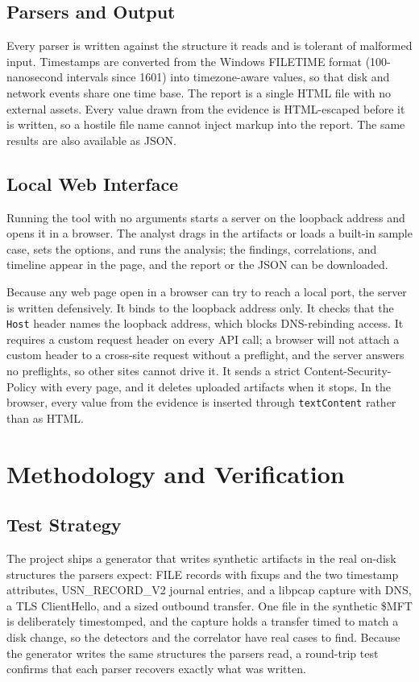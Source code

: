 \documentclass[12pt,onecolumn]{IEEEtran}
\begin{document}
\subsection{Parsers and Output}
Every parser is written against the structure it reads and is tolerant of malformed input. Timestamps are converted from the Windows FILETIME format (100-nanosecond intervals since 1601) into timezone-aware values, so that disk and network events share one time base. The report is a single HTML file with no external assets. Every value drawn from the evidence is HTML-escaped before it is written, so a hostile file name cannot inject markup into the report. The same results are also available as JSON.

\subsection{Local Web Interface}
Running the tool with no arguments starts a server on the loopback address and opens it in a browser. The analyst drags in the artifacts or loads a built-in sample case, sets the options, and runs the analysis; the findings, correlations, and timeline appear in the page, and the report or the JSON can be downloaded.

Because any web page open in a browser can try to reach a local port, the server is written defensively. It binds to the loopback address only. It checks that the \texttt{Host} header names the loopback address, which blocks DNS-rebinding access. It requires a custom request header on every API call; a browser will not attach a custom header to a cross-site request without a preflight, and the server answers no preflights, so other sites cannot drive it. It sends a strict Content-Security-Policy with every page, and it deletes uploaded artifacts when it stops. In the browser, every value from the evidence is inserted through \texttt{textContent} rather than as HTML.

\section{Methodology and Verification}

\subsection{Test Strategy}
The project ships a generator that writes synthetic artifacts in the real on-disk structures the parsers expect: FILE records with fixups and the two timestamp attributes, USN\_RECORD\_V2 journal entries, and a libpcap capture with DNS, a TLS ClientHello, and a sized outbound transfer. One file in the synthetic \$MFT is deliberately timestomped, and the capture holds a transfer timed to match a disk change, so the detectors and the correlator have real cases to find. Because the generator writes the same structures the parsers read, a round-trip test confirms that each parser recovers exactly what was written.
\end{document}

